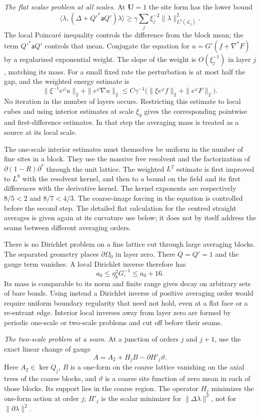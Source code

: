 \documentclass[11pt,letterpaper,reqno]{amsart}
\theoremstyle{definition}
\theoremstyle{remark}
\begin{document}
\emph{The flat scalar problem at all scales.}
At $\mathbf U=1$ the site form has the lower bound
\[
 \langle\lambda,(\Delta+Q'^*\mathsf a Q')\lambda\rangle
       \ge\gamma\sum_j\xi_j^{-2}
                            \|\lambda\|_{L^2(\mathcal L_j)}^2.
\]
The local Poincar\'e inequality controls the difference from the
block mean; the term $Q'^*\mathsf a Q'$ controls that mean.
Conjugate the equation for
$u=G'(f+\nabla^*F)$ by a regularized exponential weight.
The slope of the weight is $O(\xi_j^{-1})$ in layer $j$,
matching its mass. For a small fixed rate the perturbation is
at most half the gap, and the weighted energy estimate is
\[
 \|\xi^{-1}e^\varphi u\|_2
       +\|e^\varphi\nabla u\|_2
 \le C\gamma^{-1}
       \big(\|\xi e^\varphi f\|_2+\|e^\varphi F\|_2\big).
\]
No iteration in the number of layers occurs. Restricting this
estimate to local cubes and using interior estimates at scale
$\xi_y$ gives the corresponding pointwise and first-difference
estimates. In that step the averaging mass is treated as a
source at its local scale.

The one-scale interior estimates must themselves be uniform in
the number of fine sites in a block. They use the massive free
resolvent and the factorization of
$\partial(1-R)\partial^*$ through the unit lattice. The
weighted $L^2$ estimate is first improved to $L^8$ with the
resolvent kernel, and then to a bound on the field and its first
differences with the derivative kernel. The kernel exponents
are respectively $8/5<2$ and $8/7<4/3$. The coarse-image
forcing in the equation is controlled before the second step.
The detailed flat calculation for the centred straight averages
is given again at its curvature use below; it does not by itself
address the seams between different averaging orders.

There is no Dirichlet problem on a fine lattice cut through
large averaging blocks. The separated geometry places
$\partial\Omega_0$ in layer zero. There $Q=Q'=1$ and the
gauge term vanishes. A local Dirichlet inverse therefore has
\[
 a_0\le\eta_k^2G_\square^{-1}\le a_0+16.
\]
Its mass is comparable to its norm and finite range gives
decay on arbitrary sets of bare bonds. Using instead a
Dirichlet inverse of positive averaging order would require
uniform boundary regularity that need not hold, even at a flat
face or a re-entrant edge. Interior local inverses away from
layer zero are formed by periodic one-scale or two-scale
problems and cut off before their seams.

\emph{The two-scale problem at a seam.}
At a junction of orders $j$ and $j+1$, use the exact linear
change of gauge
\[
 A=A_2+H_jB-\partial H'_j\vartheta.
\]
Here $A_2\in\ker Q_j$, $B$ is a one-form on the coarse
lattice vanishing on the axial trees of the coarse blocks,
and $\vartheta$ is a coarse site function of zero mean in
each of those blocks. Its support lies in the coarse region.
The operator $H_j$ minimizes the one-form action at order
$j$; $H'_j$ is the scalar minimizer for $\|\Delta\lambda\|^2$,
not for $\|\partial\lambda\|^2$.
\end{document}
